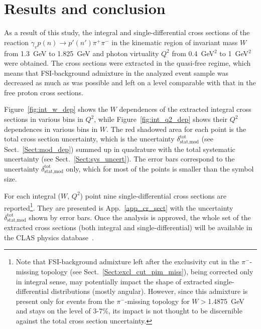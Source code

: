 \chapter{Results and conclusion}
\label{Sect:concl}
\vspace{-0.25em}
As a result of this study, the integral and single-differential cross sections of the reaction $\gamma_{v}p(n) \rightarrow p' (n')\pi^{+}\pi^{-}$ in the kinematic region of invariant mass $W$ from 1.3~GeV to 1.825~GeV and photon virtuality $Q^{2}$ from 0.4~GeV$^2$ to 1~GeV$^2$ were obtained. The cross sections were extracted in the quasi-free regime, which means that FSI-background admixture in the analyzed event sample was decreased as much as was possible and left on a level comparable with that in the free proton cross sections.


Figure~\ref{fig:int_w_dep} shows the $W$ dependences of the extracted integral cross sections in various bins in $Q^{2}$, while Figure~\ref{fig:int_q2_dep} shows their $Q^{2}$ dependences in various bins in $W$. The red shadowed area for each point is the total cross section uncertainty, which is the uncertainty $\delta_{\text{stat,mod}}^{\text{tot}}$ (see Sect.~\ref{Sect:mod_dep}) summed up in quadrature with the total systematic uncertainty (see Sect.~\ref{Sect:sys_uncert}). The error bars correspond to the uncertainty $\delta_{\text{stat,mod}}^{\text{tot}}$ only, which for most of the points is smaller than the symbol size.

For each integral ($W$, $Q^{2}$) point nine single-differential cross sections are reported\footnote[1]{Note that FSI-background admixture left after the exclusivity cut in the $\pi^{-}$-missing topology (see Sect.~\ref{Sect:excl_cut_pim_miss}), being corrected only in integral sense, may potentially impact the shape of extracted single-differential distributions (mostly angular). However, since this admixture is present only for events from the $\pi^{-}$-missing topology for $W>$1.4875~GeV and stays on the level of 3-7\%, its impact is not thought to be discernible against the total cross section uncertainty.}. They are presented is App.~\ref{app_cr_sect} with the uncertainty $\delta_{\text{stat,mod}}^{\text{tot}}$ shown by error bars. Once the analysis is approved, the whole set of the extracted cross sections (both integral and single-differential) will be available in the CLAS physics database~\cite{CLAS_DB}.



